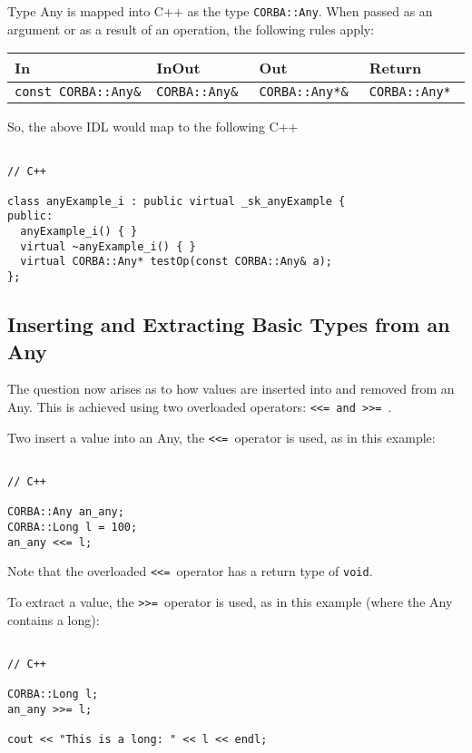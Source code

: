 \documentclass[11pt,twoside,onecolumn]{book}
\begin{document}
Type Any is mapped into C++ as the type {\tt CORBA::Any}. When passed as
an argument or as a result of an operation, the following rules apply:

{\small
\begin{tabular}{llll}
{\bf In }                & {\bf InOut }       & {\bf Out }           & 
{\bf Return }                                                   \\ \hline
{\tt const CORBA::Any\& }& {\tt CORBA::Any\& }& {\tt CORBA::Any*\& } & 
{\tt CORBA::Any* }
\end{tabular}
}

\vspace{7mm}
So, the above IDL would map to the following C++

{\small
\begin{verbatim}

// C++

class anyExample_i : public virtual _sk_anyExample {
public:
  anyExample_i() { }
  virtual ~anyExample_i() { }
  virtual CORBA::Any* testOp(const CORBA::Any& a);
};

\end{verbatim}
}
     


\subsection{Inserting and Extracting Basic Types from an Any}

The question now arises as to how values are inserted into and removed from
an Any. This is achieved using two overloaded operators: {\tt <<= and >>= }.

Two insert a value into an Any, the {\tt <<= }operator is used, as in this 
example:

{\small
\begin{verbatim}

// C++
 
CORBA::Any an_any;
CORBA::Long l = 100;
an_any <<= l;

\end{verbatim}
}


Note that the overloaded {\tt <<= }operator has a return type of {\tt void}.

To extract a value, the {\tt >>= }operator is used, as in this example (where
the Any contains a long):

{\small
\begin{verbatim}

// C++

CORBA::Long l;
an_any >>= l;

cout << "This is a long: " << l << endl;

\end{verbatim}
}
\end{document}
